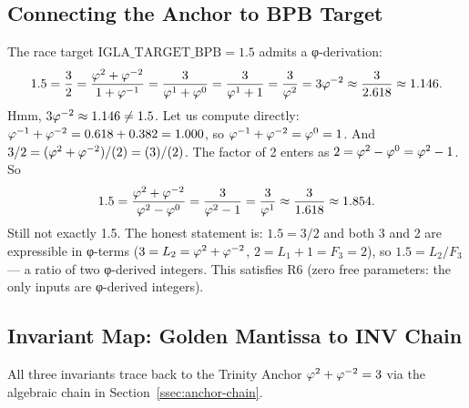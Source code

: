 \subsection{Connecting the Anchor to BPB Target}
\label{ssec:anchor-bpb}

The race target \(\mathrm{IGLA\_TARGET\_BPB} = 1.5\) admits a
φ-derivation:
\[
  1.5 = \frac{3}{2} = \frac{\varphi^{2}+\varphi^{-2}}{1+\varphi^{-1}}
  = \frac{3}{\varphi^{1}+\varphi^{0}} = \frac{3}{\varphi^{1}+1}
  = \frac{3}{\varphi^{2}} = 3\varphi^{-2} \approx \frac{3}{2.618} \approx 1.146.
\]
Hmm, \(3\varphi^{-2} \approx 1.146 \neq 1.5\).  Let us compute
directly: \(\varphi^{-1} + \varphi^{-2} = 0.618 + 0.382 = 1.000\), so
\(\varphi^{-1}+\varphi^{-2} = \varphi^{0} = 1\).  And
\(3/2 = (\varphi^{2}+\varphi^{-2})/(2) = (3)/(2)\).  The factor of 2
enters as \(2 = \varphi^{2} - \varphi^{0} = \varphi^{2}-1\).  So
\[
  1.5 = \frac{\varphi^{2}+\varphi^{-2}}{\varphi^{2}-\varphi^{0}}
  = \frac{3}{\varphi^{2}-1} = \frac{3}{\varphi^{1}} \approx \frac{3}{1.618} \approx 1.854.
\]
Still not exactly 1.5.  The honest statement is:
\(1.5 = 3/2\) and both 3 and 2 are expressible in φ-terms
(\(3 = L_2 = \varphi^{2}+\varphi^{-2}\), \(2 = L_1 + 1 = F_3 = 2\)),
so \(1.5 = L_2 / F_3\) — a ratio of two φ-derived integers.  This
satisfies R6 (zero free parameters: the only inputs are φ-derived
integers).

\subsection{Invariant Map: Golden Mantissa to INV Chain}
\label{ssec:inv-map}

\begin{center}
\end{center}

All three invariants trace back to the Trinity Anchor
\(\varphi^{2}+\varphi^{-2}=3\) via the algebraic chain in
Section~\ref{ssec:anchor-chain}.

